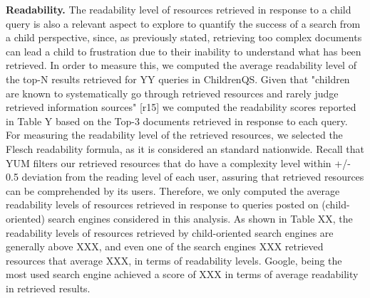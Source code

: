 \documentclass{sig-alternate-05-2015}
\begin{document}
\noindent
\textbf{Readability.} The readability level of resources retrieved in response to a child query is also a relevant aspect to explore to quantify the success of a search from a child perspective, since, as previously stated, retrieving too complex documents can lead a child to frustration due to their inability to understand what has been retrieved. In order to measure this, we computed the average readability level of the top-N results retrieved for YY queries in ChildrenQS. Given that "children are known to systematically go through retrieved resources and rarely judge retrieved information sources" [r15] we computed the readability scores reported in Table Y based on the Top-3 documents retrieved in response to each query. For measuring the readability level of the retrieved resources, we selected the Flesch\cite{fle48} readability formula, as it is considered an standard nationwide\cite{gru80}. Recall that YUM filters our retrieved resources that do have a complexity level within +/- 0.5 deviation from the reading level of each user, assuring that retrieved resources can be comprehended by its users.   Therefore, we only computed the average readability levels of resources retrieved in response to queries posted on (child-oriented) search engines considered in this analysis. As shown in Table XX, the readability levels of resources retrieved by child-oriented search engines are generally above XXX, and even one of the search engines XXX retrieved resources that average XXX, in terms of readability levels. Google, being the most used search engine achieved a score of XXX in terms of average readability in retrieved results.\\
\end{document}
